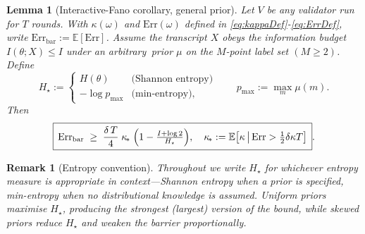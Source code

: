 \documentclass[11pt]{article}
\newtheorem*{remark}{Remark}
\newcommand{\Err}{\mathrm{Err}}
\newcommand{\E}{\mathbb{E}}
\newtheorem{lemma}{Lemma}
\begin{document}
\begin{lemma}[Interactive-Fano corollary, general prior]\label{lem:ErrLower}
Let $V$ be any validator run for $T$ rounds.
With $\kappa(\omega)$ and $\Err(\omega)$ defined in
\eqref{eq:kappaDef}-\eqref{eq:ErrDef}, write
$\Err_{\mathrm{bar}}:=\E[\Err]$.
Assume the transcript $X$ obeys the information budget
$I(\theta;X)\le I$ under an arbitrary\, prior $\mu$ on the $M$-point label set $(M\!\ge\!2)$.
Define
\[
  H_{\star}:=
  \begin{cases}
      H(\theta) & \text{(Shannon entropy)}\\[4pt]
      -\log p_{\max} & \text{(min-entropy),}
  \end{cases}
  \qquad
  p_{\max}:=\max_{m}\mu(m).
\]
Then
\begin{equation}\label{eq:ErrLower-general}
  \boxed{\,%
   \Err_{\mathrm{bar}}
   \;\ge\;
   \frac{\delta\,T}{4}\;
   \kappa_{\!*}\;
   \Bigl(1-\tfrac{I+\log 2}{H_{\star}}\Bigr),
   \quad
   \kappa_{\!*}:=
     \E\bigl[\kappa\,\bigl|\,\Err>\tfrac12\delta\kappa T\bigr]
  \,}.
\end{equation}
\end{lemma}

\begin{remark}[Entropy convention]
Throughout we write $H_{\star}$ for whichever entropy measure is appropriate
in context—Shannon entropy when a prior is specified, min-entropy when no
distributional knowledge is assumed.
Uniform priors maximise $H_{\star}$, producing the strongest (largest)
version of the bound, while skewed priors reduce $H_{\star}$ and weaken the
barrier proportionally.
\end{remark}
\end{document}
